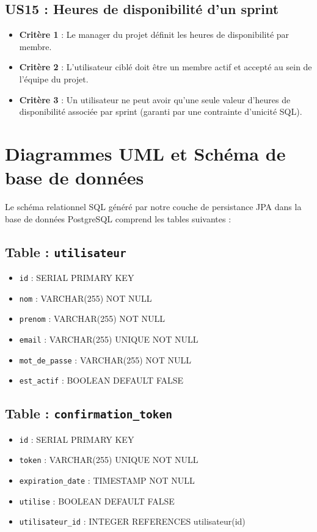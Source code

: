 \documentclass[12pt,a4paper]{report}
\begin{document}
\section*{US15 : Heures de disponibilité d'un sprint}
\begin{itemize}
\item \textbf{Critère 1} : Le manager du projet définit les heures de disponibilité par membre.
\item \textbf{Critère 2} : L'utilisateur ciblé doit être un membre actif et accepté au sein de l'équipe du projet.
\item \textbf{Critère 3} : Un utilisateur ne peut avoir qu'une seule valeur d'heures de disponibilité associée par sprint (garanti par une contrainte d'unicité SQL).
\end{itemize}

\chapter{Diagrammes UML et Schéma de base de données}

Le schéma relationnel SQL généré par notre couche de persistance JPA dans la base de données PostgreSQL comprend les tables suivantes :

\section*{Table : \texttt{utilisateur}}
\begin{itemize}
\item \verb|id| : SERIAL PRIMARY KEY
\item \verb|nom| : VARCHAR(255) NOT NULL
\item \verb|prenom| : VARCHAR(255) NOT NULL
\item \verb|email| : VARCHAR(255) UNIQUE NOT NULL
\item \verb|mot_de_passe| : VARCHAR(255) NOT NULL
\item \verb|est_actif| : BOOLEAN DEFAULT FALSE
\end{itemize}

\section*{Table : \texttt{confirmation\_token}}
\begin{itemize}
\item \verb|id| : SERIAL PRIMARY KEY
\item \verb|token| : VARCHAR(255) UNIQUE NOT NULL
\item \verb|expiration_date| : TIMESTAMP NOT NULL
\item \verb|utilise| : BOOLEAN DEFAULT FALSE
\item \verb|utilisateur_id| : INTEGER REFERENCES utilisateur(id)
\end{itemize}
\end{document}
